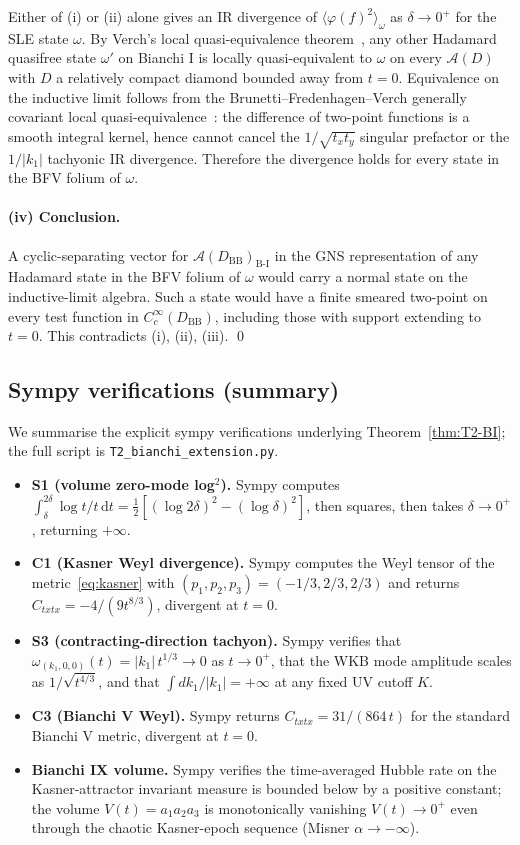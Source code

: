 \documentclass[11pt]{article}
\theoremstyle{definition}
\renewcommand{\AA}{\mathcal{A}}
\newcommand{\BI}{\mathrm{B\text{-}I}}
\newcommand{\BB}{\mathrm{BB}}
\begin{document}
Either of (i) or (ii) alone gives an IR divergence of $\langle\varphi(f)^2\rangle_\omega$ as $\delta\to 0^+$ for the SLE state $\omega$. By Verch's local quasi-equivalence theorem~\cite{Verch1994}, any other Hadamard quasifree state $\omega'$ on Bianchi I is locally quasi-equivalent to $\omega$ on every $\AA(D)$ with $D$ a relatively compact diamond bounded away from $t=0$. Equivalence on the inductive limit follows from the Brunetti--Fredenhagen--Verch generally covariant local quasi-equivalence~\cite{BrunettiFredenhagenVerch2003}: the difference of two-point functions is a smooth integral kernel, hence cannot cancel the $1/\sqrt{t_x t_y}$ singular prefactor or the $1/|k_1|$ tachyonic IR divergence. Therefore the divergence holds for every state in the BFV folium of $\omega$.

\paragraph{(iv) Conclusion.}

A cyclic-separating vector for $\AA(D_\BB)_\BI$ in the GNS representation of any Hadamard state in the BFV folium of $\omega$ would carry a normal state on the inductive-limit algebra. Such a state would have a finite smeared two-point on every test function in $C_c^\infty(D_\BB)$, including those with support extending to $t=0$. This contradicts (i), (ii), (iii). \qed

\subsection{Sympy verifications (summary)}\label{sec:T2-sympy}

We summarise the explicit sympy verifications underlying Theorem~\ref{thm:T2-BI}; the full script is \texttt{T2\_bianchi\_extension.py}.

\begin{itemize}
\item \textbf{S1 (volume zero-mode log$^2$).} Sympy computes $\int_\delta^{2\delta}\log t/t\,\mathrm{d}t = \tfrac12[(\log 2\delta)^2-(\log\delta)^2]$, then squares, then takes $\delta\to 0^+$, returning $+\infty$.
\item \textbf{C1 (Kasner Weyl divergence).} Sympy computes the Weyl tensor of the metric~\eqref{eq:kasner} with $(p_1,p_2,p_3)=(-1/3,2/3,2/3)$ and returns $C_{txtx}=-4/(9 t^{8/3})$, divergent at $t=0$.
\item \textbf{S3 (contracting-direction tachyon).} Sympy verifies that $\omega_{(k_1,0,0)}(t)=|k_1|\,t^{1/3}\to 0$ as $t\to 0^+$, that the WKB mode amplitude scales as $1/\sqrt{t^{4/3}}$, and that $\int dk_1/|k_1|=+\infty$ at any fixed UV cutoff $K$.
\item \textbf{C3 (Bianchi V Weyl).} Sympy returns $C_{txtx}=31/(864\,t)$ for the standard Bianchi V metric, divergent at $t=0$.
\item \textbf{Bianchi IX volume.} Sympy verifies the time-averaged Hubble rate on the Kasner-attractor invariant measure is bounded below by a positive constant; the volume $V(t)=a_1 a_2 a_3$ is monotonically vanishing $V(t)\to 0^+$ even through the chaotic Kasner-epoch sequence (Misner $\alpha\to-\infty$).
\end{itemize}
\end{document}
